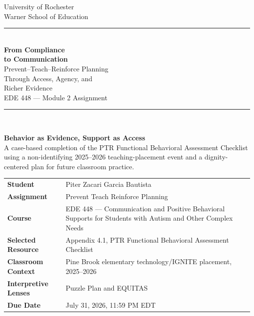 \documentclass[11pt]{article}
\begin{document}
\hypersetup{pageanchor=false}
\begin{titlepage}
\thispagestyle{empty}

\begin{center}
{\large University of Rochester\\}
{\normalsize Warner School of Education\\[0.15in]}

{\color{PrimaryRed}\rule{\textwidth}{1.4pt}}\\[0.12in]
{\Huge\bfseries From Compliance\\[0.07in]
to Communication}\\[0.15in]
{\huge Prevent--Teach--Reinforce Planning\\[0.07in]
Through Access, Agency, and\\[0.07in]
Richer Evidence}\\[0.18in]
{\Large EDE 448 --- Module 2 Assignment}\\[0.12in]

\vfill

{\color{PrimaryRed}\rule{0.78\textwidth}{0.7pt}}\\[0.22in]

\colorbox{SoftBlue}{%
\parbox{0.88\textwidth}{%
\centering\small\vspace{0.02in}
\textbf{Behavior as Evidence, Support as Access}\\[0.05in]
A case-based completion of the PTR Functional Behavioral Assessment Checklist using a non-identifying 2025--2026 teaching-placement event and a dignity-centered plan for future classroom practice.
}%
}
\end{center}

\vfill

\begin{center}
\renewcommand{\arraystretch}{1.18}
\setlength{\tabcolsep}{4pt}
\begin{tabular}{>{\bfseries\RaggedLeft}p{1.65in} p{5.0in}}
Student & Piter Zacari Garcia Bautista \\
Assignment & Prevent Teach Reinforce Planning \\
Course & EDE 448 --- Communication and Positive Behavioral Supports for Students with Autism and Other Complex Needs \\
Selected Resource & Appendix 4.1, PTR Functional Behavioral Assessment Checklist \\
Classroom Context & Pine Brook elementary technology/IGNITE placement, 2025--2026 \\
Interpretive Lenses & Puzzle Plan and EQUITAS \\
Due Date & July 31, 2026, 11:59 PM EDT \\
\end{tabular}
\end{center}


\end{titlepage}
\end{document}

